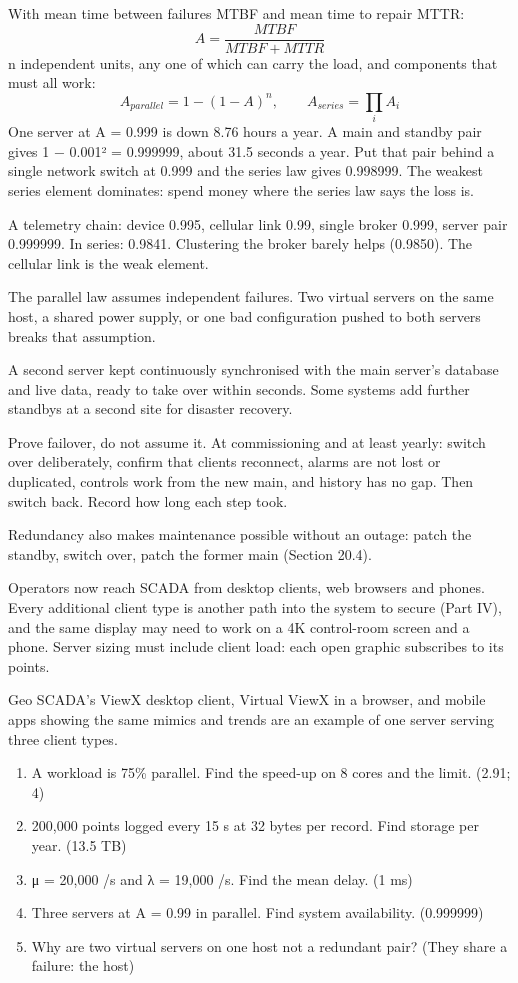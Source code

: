  With mean time between failures MTBF and mean time to repair MTTR:
\[ A = \frac{MTBF}{MTBF + MTTR} \]
 n independent units, any one of which can carry the load, and components that must all work:
\[ A_{parallel} = 1 - (1 - A)^n, \qquad A_{series} = \prod_i A_i \]
 One server at A = 0.999 is down 8.76 hours a year. A main and standby pair gives 1 − 0.001² = 0.999999, about 31.5 seconds a year. Put that pair behind a single network switch at 0.999 and the series law gives 0.998999. The weakest series element dominates: spend money where the series law says the loss is.

 A telemetry chain: device 0.995, cellular link 0.99, single broker 0.999, server pair 0.999999. In series: 0.9841. Clustering the broker barely helps (0.9850). The cellular link is the weak element.

The parallel law assumes independent failures. Two virtual servers on the same host, a shared power supply, or one bad configuration pushed to both servers breaks that assumption.

 A second server kept continuously synchronised with the main server's database and live data, ready to take over within seconds. Some systems add further standbys at a second site for disaster recovery.

\onsite Prove failover, do not assume it. At commissioning and at least yearly: switch over deliberately, confirm that clients reconnect, alarms are not lost or duplicated, controls work from the new main, and history has no gap. Then switch back. Record how long each step took.

Redundancy also makes maintenance possible without an outage: patch the standby, switch over, patch the former main (Section 20.4).

Operators now reach SCADA from desktop clients, web browsers and phones. Every additional client type is another path into the system to secure (Part IV), and the same display may need to work on a 4K control-room screen and a phone. Server sizing must include client load: each open graphic subscribes to its points.

 Geo SCADA's ViewX desktop client, Virtual ViewX in a browser, and mobile apps showing the same mimics and trends are an example of one server serving three client types.

\begin{enumerate}
\item A workload is 75\% parallel. Find the speed-up on 8 cores and the limit. (2.91; 4)
\item 200,000 points logged every 15 s at 32 bytes per record. Find storage per year. (13.5 TB)
\item μ = 20,000 /s and λ = 19,000 /s. Find the mean delay. (1 ms)
\item Three servers at A = 0.99 in parallel. Find system availability. (0.999999)
\item Why are two virtual servers on one host not a redundant pair? (They share a failure: the host)
\end{enumerate}
